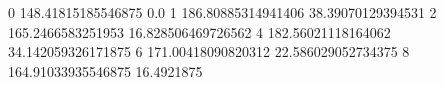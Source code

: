 0 148.41815185546875 0.0
1 186.80885314941406 38.39070129394531
2 165.2466583251953 16.828506469726562
4 182.56021118164062 34.142059326171875
6 171.00418090820312 22.586029052734375
8 164.91033935546875 16.4921875
